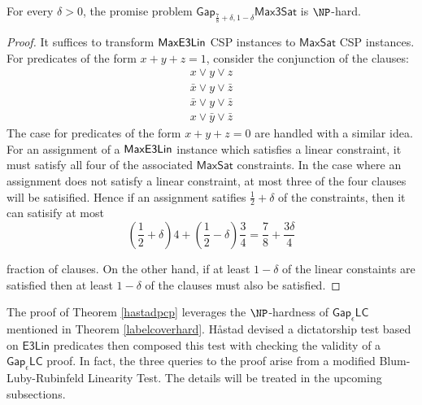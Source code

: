 \begin{corollary}
For every $\delta >0$, the promise problem $\mathsf{Gap}_{\frac{7}{8}+\delta,1-\delta}\mathsf{Max3Sat}$ is $\NP$-hard.
\end{corollary}
%
\begin{proof}
It suffices to transform $\mathsf{MaxE3Lin}$ CSP instances to $\mathsf{MaxSat}$ CSP instances. For predicates of the form $x + y + z = 1$, consider the conjunction of the clauses:
\begin{align*}
   x \vee y \vee z \\
   \bar{x} \vee y \vee \bar{z} \\
   \bar{x} \vee y \vee \bar{z} \\
   x \vee \bar{y} \vee \bar{z}
\end{align*}
The case for predicates of the form $x + y + z = 0$ are handled with a similar idea. For an assignment of a $\mathsf{MaxE3Lin}$ instance which satisfies a linear constraint, it must satisfy all four of the associated $\mathsf{MaxSat}$ constraints. In the case where an assignment does not satisfy a linear constraint, at most three of the four clauses will be satisified. Hence if an assignment satifies $\frac{1}{2} + \delta$ of the constraints, then it can satisify at most
\[ \left( \frac{1}{2} + \delta \right)4 + \left( \frac{1}{2} - \delta \right)\frac{3}{4} = \frac{7}{8} + \frac{3\delta}{4}\]

fraction of clauses. On the other hand, if at least $1 - \delta$ of the linear constaints are satisfied then at least $1 - \delta$ of the clauses must also be satisfied.
\end{proof}

The proof of Theorem \ref{hastadpcp} leverages the $\NP$-hardness of $\mathsf{Gap}_\epsilon\mathsf{LC}$ mentioned in Theorem \ref{labelcoverhard}.
%
H\aa stad devised a dictatorship test based on $\mathsf{E3Lin}$ predicates then composed this test with checking the validity of a $\mathsf{Gap}_\epsilon\mathsf{LC}$ proof.
In fact, the three queries to the proof arise from a modified Blum-Luby-Rubinfeld Linearity Test. The details will be treated in the upcoming subsections.

